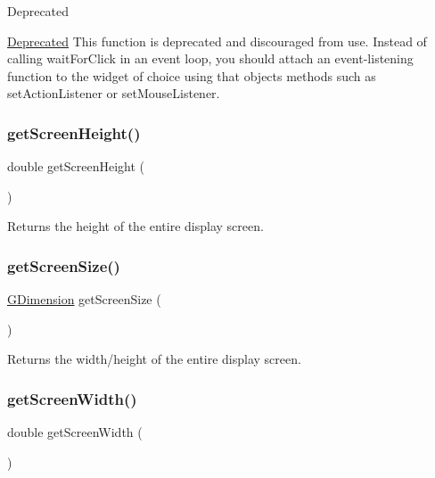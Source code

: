 \begin{DoxyRefDesc}{Deprecated}
\item[\mbox{\hyperlink{deprecated__deprecated000003}{Deprecated}}]This function is deprecated and discouraged from use. Instead of calling wait\+For\+Click in an event loop, you should attach an event-\/listening function to the widget of choice using that object\textquotesingle{}s methods such as set\+Action\+Listener or set\+Mouse\+Listener. \end{DoxyRefDesc}
\mbox{\label{namespacesgl_a9942379fdf4fb4445c35eaf3390b7ccb}} 
\subsubsection{\texorpdfstring{get\+Screen\+Height()}{getScreenHeight()}}
{\footnotesize\ttfamily double get\+Screen\+Height (\begin{DoxyParamCaption}{ }\end{DoxyParamCaption})}



Returns the height of the entire display screen. 

\mbox{\label{namespacesgl_ae3d08d5cde8163274459797770596809}} 
\subsubsection{\texorpdfstring{get\+Screen\+Size()}{getScreenSize()}}
{\footnotesize\ttfamily \mbox{\hyperlink{structsgl_1_1GDimension}{G\+Dimension}} get\+Screen\+Size (\begin{DoxyParamCaption}{ }\end{DoxyParamCaption})}



Returns the width/height of the entire display screen. 

\mbox{\label{namespacesgl_adc82933bd579ab83d7cd4e3bc5f79a12}} 
\subsubsection{\texorpdfstring{get\+Screen\+Width()}{getScreenWidth()}}
{\footnotesize\ttfamily double get\+Screen\+Width (\begin{DoxyParamCaption}{ }\end{DoxyParamCaption})}



